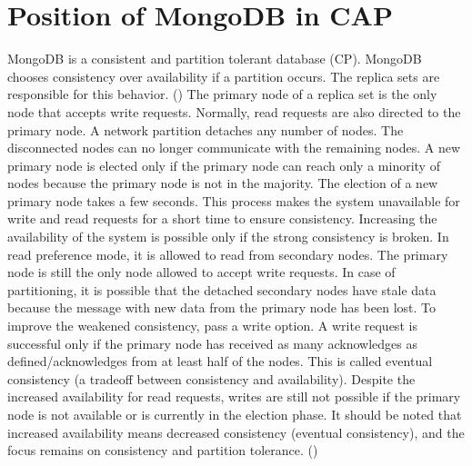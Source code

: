 \section*{Position of MongoDB in CAP}
MongoDB is a consistent and partition tolerant database (\acs{CP}). MongoDB chooses consistency over availability if a partition occurs. The replica sets are responsible for this behavior. (\cite{stackoverflow:2023})
The primary node of a replica set is the only node that accepts write requests. Normally, read requests are also directed to the primary node. A network partition detaches any number of nodes. The disconnected nodes can no longer communicate with the remaining nodes. A new primary node is elected only if the primary node can reach only a minority of nodes because the primary node is not in the majority. The election of a new primary node takes a few seconds. This process makes the system unavailable for write and read requests for a short time to ensure consistency.\newline
Increasing the availability of the system is possible only if the strong consistency is broken. In read preference mode, it is allowed to read from secondary nodes. The primary node is still the only node allowed to accept write requests. In case of partitioning, it is possible that the detached secondary nodes have stale data because the message with new data from the primary node has been lost.\newline
To improve the weakened consistency, pass a write option. A write request is successful only if the primary node has received as many acknowledges as defined/acknowledges from at least half of the nodes. This is called eventual consistency (a tradeoff between consistency and availability). Despite the increased availability for read requests, writes are still not possible if the primary node is not available or is currently in the election phase. It should be noted that increased availability means decreased consistency (eventual consistency), and the focus remains on consistency and partition tolerance. 
(\cite{katwal:2020})
